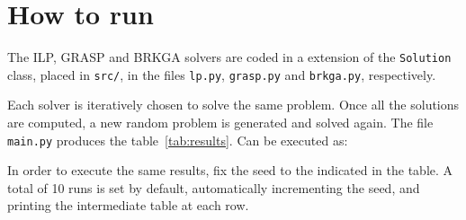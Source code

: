 \documentclass[12pt,a4paper]{article}
\begin{document}

\section{How to run}

The ILP, GRASP and BRKGA solvers are coded in a extension of the 
\texttt{Solution} class, placed in \texttt{src/}, in the files \texttt{lp.py}, 
\texttt{grasp.py} and \texttt{brkga.py}, respectively.

Each solver is iteratively chosen to solve the same problem. Once all the 
solutions are computed, a new random problem is generated and solved again. The 
file \texttt{main.py} produces the table~\ref{tab:results}. Can be executed as:
%
\begin{textcode}
\end{textcode}
%
In order to execute the same results, fix the seed to the indicated in the 
table. A total of 10 runs is set by default, automatically incrementing the 
seed, and printing the intermediate table at each row.
\end{document}
